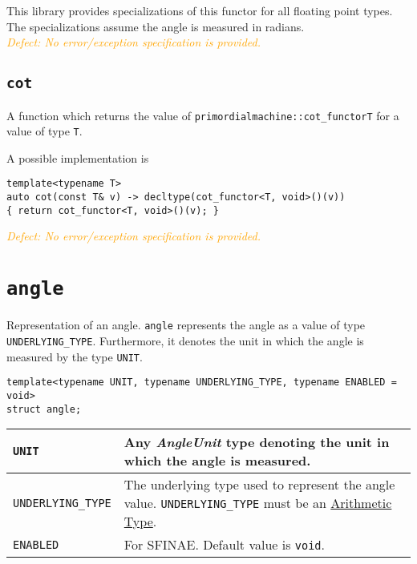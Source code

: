 \documentclass[oneside]{report}
\begin{document}
\noindent{}This library provides specializations of this functor for all floating point types.
The specializations assume the angle is measured in radians.\\

\noindent{}\textcolor{orange}{\textit{Defect: No error/exception specification is provided.}}

\subsection{\texttt{cot}}
A function which returns the value of \texttt{primordialmachine::cot\_functor\textlangle T\textrangle}
for a value of type \texttt{T}.

\noindent{}A possible implementation is
\begin{verbatim}
template<typename T>
auto cot(const T& v) -> decltype(cot_functor<T, void>()(v))
{ return cot_functor<T, void>()(v); }
\end{verbatim}

\noindent{}\textcolor{orange}{\textit{Defect: No error/exception specification is provided.}}
\section{\texttt{angle}}
Representation of an angle. \texttt{angle} represents the angle as a value of type \texttt{UNDERLYING\_TYPE}.
Furthermore, it denotes the unit in which the angle is measured by the type \texttt{UNIT}.
\begin{verbatim}
template<typename UNIT, typename UNDERLYING_TYPE, typename ENABLED = void>
struct angle;
\end{verbatim}

\begin{center}
\begin{tabularx}{\textwidth}{|>{\hsize=0.5\hsize}X|>{\hsize=1.5\hsize}X|}
\hline
\texttt{UNIT}             & Any \textit{AngleUnit} type denoting the unit in which the angle is measured.\\\hline
\texttt{UNDERLYING\_TYPE} & The underlying type used to represent the angle value.
                            \texttt{UNDERLYING\_TYPE} must be an \href{https://en.cppreference.com/w/c/language/arithmetic_types}{Arithmetic Type}.\\\hline
\texttt{ENABLED}          & For SFINAE. Default value is \texttt{void}.\\\hline
\end{tabularx}
\end{center}
\end{document}
